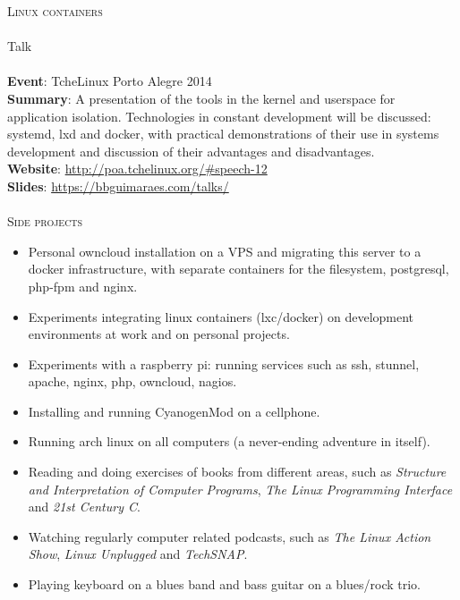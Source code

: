 \noindent
\textsc{\Large Linux containers} \\\\
Talk \\\\
\textbf{Event}: TcheLinux Porto Alegre 2014 \\
\textbf{Summary}:
    A presentation of the tools in the kernel and userspace for application
    isolation. Technologies in constant development will be discussed: systemd,
    lxd and docker, with practical demonstrations of their use in systems
    development and discussion of their advantages and disadvantages. \\
\textbf{Website}: \url{http://poa.tchelinux.org/#speech-12} \\
\textbf{Slides}: \url{https://bbguimaraes.com/talks/} \\\\

\noindent
\textsc{\Large Side projects} \\
\begin{itemize}
    \vspace{-2.5mm}
    \itemsep-1mm
    \item Personal owncloud installation on a VPS and migrating this server to
        a docker infrastructure, with separate containers for the filesystem,
        postgresql, php-fpm and nginx.
    \item Experiments integrating linux containers (lxc/docker) on development
        environments at work and on personal projects.
    \item Experiments with a raspberry pi: running services such as ssh,
        stunnel, apache, nginx, php, owncloud, nagios.
    \item Installing and running CyanogenMod on a cellphone.
    \item Running arch linux on all computers (a never-ending adventure in
        itself).
    \item Reading and doing exercises of books from different areas, such as
        \textit{Structure and Interpretation of Computer Programs}, \textit{The
        Linux Programming Interface} and \textit{21st Century C}.
    \item Watching regularly computer related podcasts, such as \textit{The
        Linux Action Show}, \textit{Linux Unplugged} and \textit{TechSNAP}.
    \item Playing keyboard on a blues band and bass guitar on a blues/rock
        trio.
\end{itemize}
